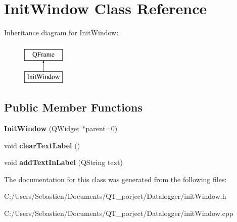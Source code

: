 \hypertarget{class_init_window}{}\section{Init\+Window Class Reference}
\label{class_init_window}
Inheritance diagram for Init\+Window\+:\begin{figure}[H]
\begin{center}
\leavevmode
\includegraphics[height=2.000000cm]{class_init_window}
\end{center}
\end{figure}
\subsection*{Public Member Functions}
\begin{DoxyCompactItemize}
\item 
\mbox{\label{class_init_window_af37dca6fb5d93b44043fae9b40e491c2}} 
{\bfseries Init\+Window} (Q\+Widget $\ast$parent=0)
\item 
\mbox{\label{class_init_window_af821b5ab5b2a17b87dc386a3a9fe4427}} 
void {\bfseries clear\+Text\+Label} ()
\item 
\mbox{\label{class_init_window_afc9bd5edd4cd8fbaca7bbe35e57acff3}} 
void {\bfseries add\+Text\+In\+Label} (Q\+String text)
\end{DoxyCompactItemize}


The documentation for this class was generated from the following files\+:\begin{DoxyCompactItemize}
\item 
C\+:/\+Users/\+Sebastien/\+Documents/\+Q\+T\+\_\+porject/\+Datalogger/init\+Window.\+h\item 
C\+:/\+Users/\+Sebastien/\+Documents/\+Q\+T\+\_\+porject/\+Datalogger/init\+Window.\+cpp\end{DoxyCompactItemize}
